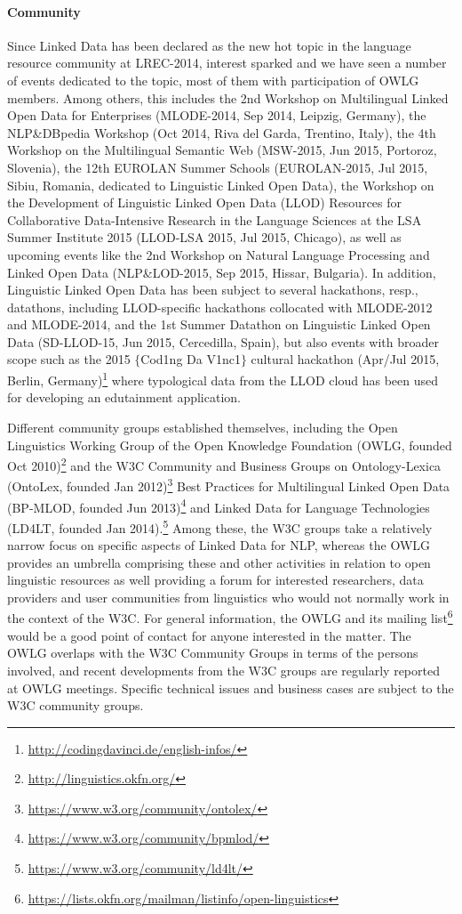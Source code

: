 \paragraph{Community}
Since Linked Data has been declared as the new hot topic in the language resource community at LREC-2014, interest sparked and we have seen a number of events dedicated to the topic, most of them with participation of OWLG members. 
Among others, this includes 
the 2nd Workshop on Multilingual Linked Open Data for Enterprises (MLODE-2014, Sep 2014, Leipzig, Germany), 
the NLP\&DBpedia Workshop (Oct 2014, Riva del Garda, Trentino, Italy), 
the 4th Workshop on the Multilingual Semantic Web (MSW-2015, Jun 2015, Portoroz, Slovenia),
the 12th EUROLAN Summer Schools (EUROLAN-2015, Jul 2015, Sibiu, Romania, dedicated to Linguistic Linked Open Data),
the Workshop on the Development of Linguistic Linked Open Data (LLOD) Resources for Collaborative Data-Intensive Research in the Language Sciences at the LSA Summer Institute 2015 (LLOD-LSA 2015, Jul 2015, Chicago),
as well as upcoming events like 
the 2nd Workshop on Natural Language Processing and Linked Open Data (NLP\&LOD-2015, Sep 2015, Hissar, Bulgaria). 
In addition, Linguistic Linked Open Data has been subject to several hackathons, resp., datathons,
including LLOD-specific hackathons collocated with MLODE-2012 and MLODE-2014, and the 1st Summer Datathon on Linguistic Linked Open Data (SD-LLOD-15, Jun 2015, Cercedilla, Spain), 
but also events with broader scope such as the 2015 $\{$Cod1ng Da V1nc1$\}$ cultural hackathon (Apr/Jul 2015, Berlin, Germany)\footnote{
	\url{http://codingdavinci.de/english-infos/}
}
where typological data from the LLOD cloud has been used for developing an edutainment application.

Different community groups established themselves, including the 
Open Linguistics Working Group of the Open Knowledge Foundation (OWLG, founded Oct 2010)\footnote{
	\url{http://linguistics.okfn.org/}
}
and the W3C Community and Business Groups on Ontology-Lexica (OntoLex, founded Jan 2012)\footnote{
	\url{https://www.w3.org/community/ontolex/}
}
Best Practices for Multilingual Linked Open Data (BP-MLOD, founded Jun 2013)\footnote{
	\url{https://www.w3.org/community/bpmlod/}
} and Linked Data for Language Technologies (LD4LT, founded Jan 2014).\footnote{
	\url{https://www.w3.org/community/ld4lt/}
}
Among these, the W3C groups take a relatively narrow focus on specific aspects of Linked Data for NLP, whereas the OWLG provides an umbrella comprising these and other activities in relation to open linguistic resources as well providing a forum for interested researchers, data providers and user communities from linguistics who would not normally work in the context of the W3C. 
For general information, the OWLG and its mailing list\footnote{
	\url{https://lists.okfn.org/mailman/listinfo/open-linguistics}
} would be a good point of contact for anyone interested in the matter. 
The OWLG overlaps with the W3C Community Groups in terms of the persons involved, and recent developments from the W3C groups are regularly reported at OWLG meetings.
Specific technical issues and business cases are subject to the W3C community groups.


